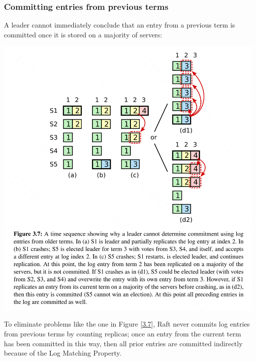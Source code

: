 \documentclass[11pt]{article}
\begin{document}
\subsubsection{Committing entries from previous terms}
\label{sec:org2492c77}
A leader cannot immediately conclude that an entry from a previous term is committed once it is stored
on a majority of servers:
\begin{center}
\includegraphics[width=.9\textwidth]{../../images/papers/12.png}
\label{3.7}
\end{center}

To eliminate problems like the one in Figure \ref{3.7}, Raft never commits log entries from previous
terms by counting replicas; once an entry from the current term has been committed in this way, then all prior
entries are committed indirectly because of the Log Matching Property.
\end{document}

